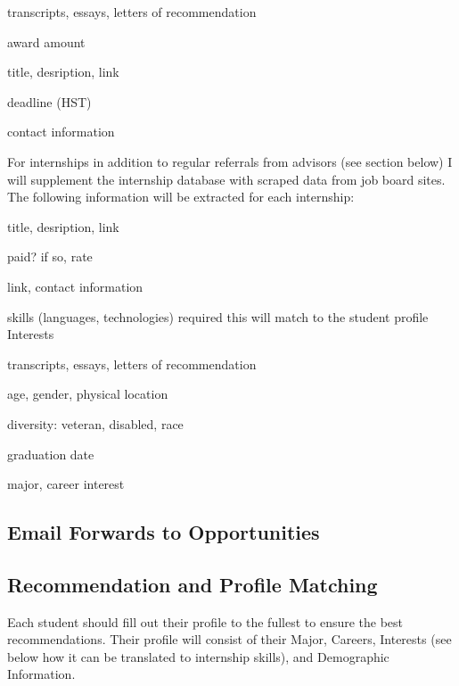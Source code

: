 \documentclass[english]{proposalnsf}
\begin{document}
			\begin{Application Requirements}
				\item transcripts, essays, letters of recommendation
			\end{Application Requirements}
		
			\begin{Information }
			\item award amount
			\item title, desription, link
			\item deadline (HST)
			\item contact information
		\end{Information }
		
		
		For internships in addition to regular referrals from advisors (see section below) I will supplement the internship database with scraped data from job board sites. The following information will be extracted for each internship:
		
		\begin{Information }
			\item title, desription, link
			\item paid? if so, rate
			\item link, contact information
		\end{Information }
		
		\begin{Application Requirements}
			\item skills (languages, technologies) required
			\subitem this will match to the student profile Interests
			\item transcripts, essays, letters of recommendation
		\end{Application Requirements}
	
			\begin{Demographic Requirements}
		\item age, gender, physical location
		\item diversity: veteran, disabled, race
		\item graduation date
		\item major, career interest
	\end{Demographic Requirements}
		
		
		\subsection{Email Forwards to Opportunities}
		
		
		\subsection{Recommendation and Profile Matching}
		Each student should fill out their profile to the fullest to ensure the best recommendations. Their profile will consist of their Major, Careers, Interests (see below how it can be translated to internship skills), and Demographic Information. 
		
\end{document}
